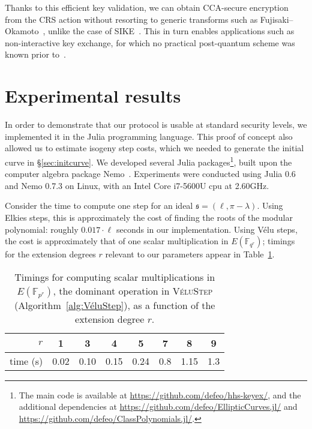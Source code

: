 \documentclass{llncs}
\newcommand{\F}{\mathbb{F}}
\newcommand{\algstyle}[1]{\textsc{#1}}
\renewcommand{\frak}{\mathfrak}
\begin{document}
Thanks to this efficient key validation, 
we can obtain CCA-secure encryption from the
CRS action without resorting to generic transforms such as
Fujisaki--Okamoto~\cite{10.1007/3-540-48405-1_34}, unlike the case of
SIKE~\cite{SIKE,10.1007/978-3-319-70500-2_12}. This in turn enables
applications such as non-interactive key exchange, for which no
practical post-quantum scheme was known prior to~\cite{csidh}.


\section{Experimental results}
\label{sec:exp}

In order to demonstrate that our protocol is usable at
standard security levels, we implemented it in the Julia programming
language. This proof of concept also allowed us to estimate 
isogeny step costs, which we needed to generate the
initial curve in \S\ref{sec:initcurve}.  We developed several
Julia packages\footnote{The main code is available at
  \url{https://github.com/defeo/hhs-keyex/}, and the additional
  dependencies at \url{https://github.com/defeo/EllipticCurves.jl/}
  and \url{https://github.com/defeo/ClassPolynomials.jl/}.}, built
upon the computer algebra package Nemo~\cite{nemo}.
Experiments were conducted
using Julia 0.6 and Nemo 0.7.3 on Linux, with an Intel Core i7-5600U cpu at 2.60GHz.

Consider the
time to compute one step for an ideal $\frak s = (\ell,\pi-\lambda)$.
Using Elkies steps, this is approximately
the cost of finding the roots of the modular polynomial:
roughly $0.017\cdot\ell$ seconds in our implementation.
Using Vélu steps, the cost is approximately
that of one scalar multiplication in $E(\F_{q^r})$;
timings for the extension degrees \(r\) relevant to our parameters
appear in Table~\ref{tab:time-vs-r}.

\begin{table}
    \centering
    \begin{tabular}{r@{\;}|@{\;}c@{\ \ }c@{\ \ }c@{\ \ }c@{\ \ }c@{\ \ }c@{\ \ }c}
        $r$ & 1 & 3 & 4 & 5 & 7 & 8 & 9 \\
        \hline
        time (s) & 0.02 & 0.10 & 0.15 & 0.24 & 0.8 & 1.15 & 1.3
    \end{tabular}
    \smallskip
    \caption{Timings for computing scalar multiplications in
    $E(\F_{p^r})$, the dominant operation in \algstyle{VéluStep}
    (Algorithm~\ref{alg:VéluStep}), as a function of the extension
    degree $r$.}
    \label{tab:time-vs-r}
\end{table}
\end{document}
